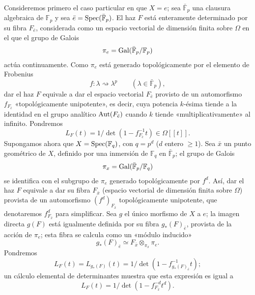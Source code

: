 Consideremos primero el caso particular en que $X=e$; sea $\bar{\mathbb F}_p$ una clausura algebraica de $\mathbb F_p$ y sea $\bar e=\operatorname{Spec}(\bar{\mathbb F}_p)$. El haz $F$ está enteramente determinado por su fibra $F_{\bar e}$, considerada como un espacio vectorial de dimensión finita sobre $\Omega$ en el que el grupo de Galois
\[
\pi_e=\operatorname{Gal}(\bar{\mathbb F}_p/\mathbb F_p)
\]
actúa continuamente. Como $\pi_e$ está generado topológicamente por el elemento de Frobenius
\[
f: \lambda\rightsquigarrow \lambda^p\qquad(\lambda\in\bar{\mathbb F}_p),
\]
dar el haz $F$ equivale a dar el espacio vectorial $F_{\bar e}$ provisto de un automorfismo $f_{F_{\bar e}}$ «topológicamente unipotente», es decir, cuya potencia $k$-ésima tiende a la identidad en el grupo analítico $\operatorname{Aut}(F_{\bar e})$ cuando $k$ tiende «multiplicativamente» al infinito. Pondremos
\[
L_F(t)=1/\det(1-f_{F_{\bar e}}^{-1}t)\in\Omega[[t]].
\]
Supongamos ahora que $X=\operatorname{Spec}(\mathbb F_q)$, con $q=p^d$ ($d$ entero $\ge1$). Sea $\bar x$ un punto geométrico de $X$, definido por una inmersión de $\mathbb F_q$ en $\bar{\mathbb F}_p$; el grupo de Galois
\[
\pi_x=\operatorname{Gal}(\bar{\mathbb F}_p/\mathbb F_q)
\]
se identifica con el subgrupo de $\pi_e$ generado topológicamente por $f^d$. Así, dar el haz $F$ equivale a dar su fibra $F_{\bar x}$ (espacio vectorial de dimensión finita sobre $\Omega$) provista de un automorfismo $(f^d)_{F_{\bar x}}$ topológicamente unipotente, que denotaremos $f^d_{F_{\bar x}}$ para simplificar. Sea $g$ el único morfismo de $X$ a $e$; la imagen directa $g(F)$ está igualmente definida por su fibra $g_*(F)_{\bar e}$, provista de la acción de $\pi_e$; esta fibra se calcula como un «módulo inducido»
\[
g_*(F)_{\bar e}\simeq F_{\bar x}\otimes_{\pi_x}\pi_e.
\]
Pondremos
\[
L_F(t)=L_{g_*(F)}(t)=1/\det(1-f^{-1}_{g_*(F)_{\bar e}}t);
\]
un cálculo elemental de determinantes muestra que esta expresión es igual a
\[
L_F(t)=1/\det(1-f^{-d}_{F_{\bar x}}t^d).
\]
